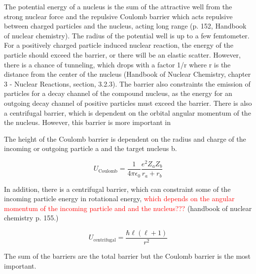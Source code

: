 The potential energy of a nucleus is the sum of the attractive well from the strong nuclear force and the repulsive Coulomb barrier which acts repulsive between charged particles and the nucleus, acting long range (p. 152, Handbook of nuclear chemistry). The radius of the potential well is up to a few femtometer. For a positively charged particle induced nuclear reaction, the energy of the particle should exceed the barrier, or there will be an elastic scatter. However, there is a chance of tunneling, which drops with a factor 1/r where r is the distance from the center of the nucleus (Handbook of Nuclear Chemistry, chapter 3 - Nuclear Reactions, section, 3.2.3). The barrier also constraints the emission of particles for a decay channel of the compound nucleus, as the energy for an outgoing decay channel of positive particles must exceed the barrier. There is also a centrifugal barrier, which is dependent on the orbital angular momentum of the the nucleus.  However, this barrier is more important in 

The height of the Coulomb barrier is dependent on the radius and charge of the incoming or outgoing particle a and the target nucleus b.

\begin{equation}
    U_\text{Coulomb} = \frac{1}{4\pi \epsilon_0} \frac{e^2Z_a Z_b}{r_a + r_b}
\end{equation}

In addition, there is a centrifugal barrier, which can constraint some of the incoming particle energy in rotational energy, \textcolor{red}{which depends on the angular momentum of the incoming particle and and the nucleus???} (handbook of nuclear chemistry p. 155.)

\begin{equation}
    U_\text{centrifugal} = \frac{\hbar \ell (\ell+1)}{r^2}
\end{equation}

The sum of the barriers are the total barrier but the Coulomb barrier is the most important. 


